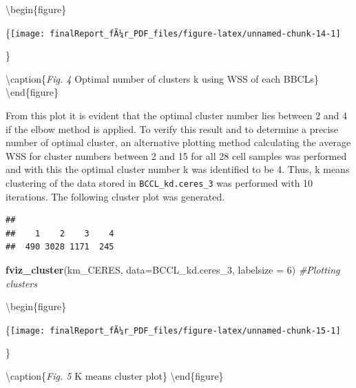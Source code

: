 \documentclass[]{article}
\newenvironment{Shaded}{\begin{snugshade}}{\end{snugshade}}
\newcommand{\CommentTok}[1]{\textcolor[rgb]{0.56,0.35,0.01}{\textit{#1}}}
\newcommand{\DataTypeTok}[1]{\textcolor[rgb]{0.13,0.29,0.53}{#1}}
\newcommand{\DecValTok}[1]{\textcolor[rgb]{0.00,0.00,0.81}{#1}}
\newcommand{\KeywordTok}[1]{\textcolor[rgb]{0.13,0.29,0.53}{\textbf{#1}}}
\newcommand{\NormalTok}[1]{#1}
\newcommand{\OperatorTok}[1]{\textcolor[rgb]{0.81,0.36,0.00}{\textbf{#1}}}
\newcommand{\StringTok}[1]{\textcolor[rgb]{0.31,0.60,0.02}{#1}}
\begin{document}
\textbackslash begin\{figure\}

\{\centering \texttt{[image: finalReport\_fÃ¼r\_PDF\_files/figure-latex/unnamed-chunk-14-1]}

\}

\textbackslash caption\{\emph{Fig. 4} Optimal number of clusters k using
WSS of each BBCLs\}\label{fig:unnamed-chunk-14}
\textbackslash end\{figure\}

From this plot it is evident that the optimal cluster number lies
between 2 and 4 if the elbow method is applied. To verify this result
and to determine a precise number of optimal cluster, an alternative
plotting method calculating the average WSS for cluster numbers between
2 and 15 for all 28 cell samples was performed and with this the optimal
cluster number k was identified to be 4. Thus, k means clustering of the
data stored in \texttt{BCCL\_kd.ceres\_3} was performed with 10
iterations. The following cluster plot was generated.

\begin{Shaded}
\end{Shaded}

\begin{verbatim}
## 
##    1    2    3    4 
##  490 3028 1171  245
\end{verbatim}

\begin{Shaded}
\begin{Highlighting}[]
\KeywordTok{fviz_cluster}\NormalTok{(km_CERES, }\DataTypeTok{data=}\NormalTok{BCCL_kd.ceres_}\DecValTok{3}\NormalTok{, }\DataTypeTok{labelsize =} \DecValTok{6}\NormalTok{) }\CommentTok{#Plotting clusters}
\end{Highlighting}
\end{Shaded}

\textbackslash begin\{figure\}

\{\centering \texttt{[image: finalReport\_fÃ¼r\_PDF\_files/figure-latex/unnamed-chunk-15-1]}

\}

\textbackslash caption\{\emph{Fig. 5} K means cluster
plot\}\label{fig:unnamed-chunk-15} \textbackslash end\{figure\}
\end{document}
